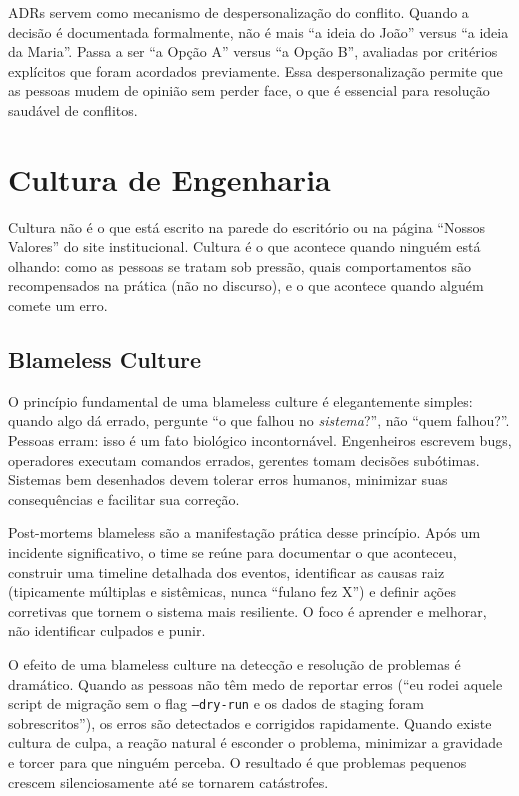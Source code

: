 ADRs servem como mecanismo de despersonalização do conflito. Quando a decisão
é documentada formalmente, não é mais ``a ideia do João'' versus ``a ideia
da Maria''. Passa a ser ``a Opção A'' versus ``a Opção B'', avaliadas por critérios
explícitos que foram acordados previamente. Essa despersonalização permite que
as pessoas mudem de opinião sem perder face, o que é essencial para resolução
saudável de conflitos.

\section{Cultura de Engenharia}

Cultura não é o que está escrito na parede do escritório ou na página
``Nossos Valores'' do site institucional. Cultura é o que acontece quando
ninguém está olhando: como as pessoas se tratam sob pressão, quais
comportamentos são recompensados na prática (não no discurso), e o que
acontece quando alguém comete um erro.

\subsection{Blameless Culture}

O princípio fundamental de uma blameless culture é elegantemente simples:
quando algo dá errado, pergunte ``o que falhou no \textit{sistema}?'', não
``quem falhou?''. Pessoas erram: isso é um fato biológico incontornável.
Engenheiros escrevem bugs, operadores executam comandos errados, gerentes
tomam decisões subótimas. Sistemas bem desenhados devem tolerar erros humanos,
minimizar suas consequências e facilitar sua correção.

Post-mortems blameless são a manifestação prática desse princípio. Após um
incidente significativo, o time se reúne para documentar o que aconteceu,
construir uma timeline detalhada dos eventos, identificar as causas raiz
(tipicamente múltiplas e sistêmicas, nunca ``fulano fez X'') e definir ações
corretivas que tornem o sistema mais resiliente. O foco é aprender e
melhorar, não identificar culpados e punir.

O efeito de uma blameless culture na detecção e resolução de problemas é
dramático. Quando as pessoas não têm medo de reportar erros (``eu rodei
aquele script de migração sem o flag \texttt{--dry-run} e os dados de staging
foram sobrescritos''), os erros são detectados e corrigidos rapidamente.
Quando existe cultura de culpa, a reação natural é esconder o problema,
minimizar a gravidade e torcer para que ninguém perceba. O resultado é que
problemas pequenos crescem silenciosamente até se tornarem catástrofes.

